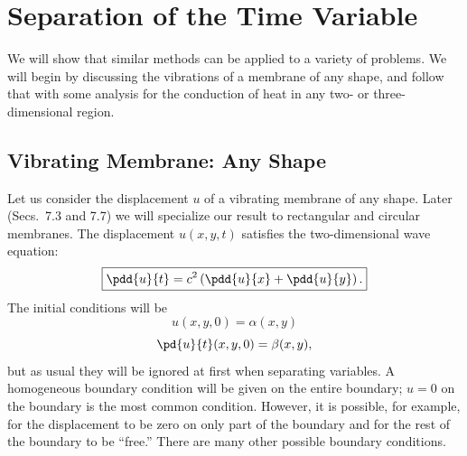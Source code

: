 \section{Separation of the Time Variable}
\label{sec:7.2}

We will show that similar methods can be applied to a variety of problems.  We will begin by discussing the vibrations of a membrane of any shape, and follow that with some analysis for the conduction of heat in any two- or three-dimensional region.

\subsection{Vibrating Membrane: Any Shape}
\label{sec:7.2.1}

Let us consider the displacement $u$ of a vibrating membrane of any shape.  Later (Secs.~7.3 and 7.7) we will specialize our result to rectangular and circular membranes.  The displacement $u(x,y,t)$ satisfies the two-dimensional wave equation:
\begin{equation}
\boxed{\pdd{u}{t} = c^2\left(\pdd{u}{x} + \pdd{u}{y}\right).}
\label{eq:7.2.1}
\end{equation}
The initial conditions will be
\begin{equation}
u(x,y,0) = \alpha(x,y)
\label{eq:7.2.2}
\end{equation}
\begin{equation}
\pd{u}{t}(x,y,0) = \beta(x,y),
\label{eq:7.2.3}
\end{equation}
but as usual they will be ignored at first when separating variables.  A homogeneous boundary condition will be given on the entire boundary; $u = 0$ on the boundary is the most common condition.  However, it is possible, for example, for the displacement to be zero on only part of the boundary and for the rest of the boundary to be ``free.''  There are many other possible boundary conditions.

